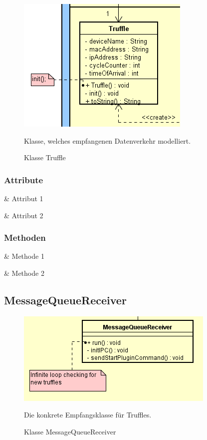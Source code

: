 \begin{figure}[H]
    \centering
    \includegraphics{../diagramimages/Truffle.png}
    \caption[Klasse Truffle]{Klasse Truffle}
    \medskip
    Klasse, welches empfangenen Datenverkehr modelliert.
\end{figure}

\subsubsection*{Attribute}

\begin{easylist}[itemize]

    & Attribut 1

    & Attribut 2

\end{easylist}

\subsubsection*{Methoden}

\begin{easylist}[itemize]

    & Methode 1

    & Methode 2

\end{easylist}

\subsection{MessageQueueReceiver}

\begin{figure}[H]
    \centering
    \includegraphics{../diagramimages/MessageQueueReceiver.png}
    \caption[Klasse MessageQueueRceceiver]{Klasse MessageQueueReceiver}
    \medskip
    Die konkrete Empfangsklasse für Truffles.
\end{figure}

